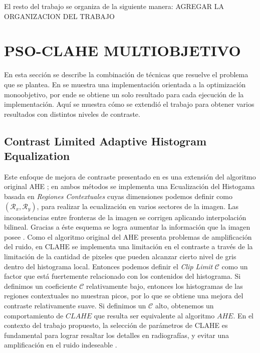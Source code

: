 \documentclass[spanish,twocolumn]{article}
\begin{document}
El resto del trabajo se organiza de la siguiente manera: {\color{red} AGREGAR LA ORGANIZACION DEL TRABAJO}




\section{PSO-CLAHE MULTIOBJETIVO}
\label{sec:psoclahe}

En esta sección se describe la combinación de técnicas que resuelve el problema que se plantea. En \cite{morebrizuela2014} se muestra una implementación orientada a la optimización monoobjetivo, por ende se obtiene un solo resultado para cada ejecución de la implementación. Aquí se muestra cómo se extendió el trabajo para obtener varios resultados con distintos niveles de contraste.

\subsection{Contrast Limited Adaptive Histogram Equalization}

Este enfoque de mejora de contraste presentado en \cite{Zuiderveld:1994:CLA:180895.180940} es una extensión del algoritmo original AHE \cite{pizer1987adaptive}; en ambos métodos se implementa una Ecualización del Histogama basada en {\it Regiones Contextuales} cuyas dimensiones podemos definir como  $(\mathcal{R}_x, \mathcal{R}_y)$, para realizar la ecualización en varios sectores de la imagen. Las inconsistencias entre fronteras de la imagen se corrigen aplicando interpolación bilineal. Gracias a éste esquema se logra aumentar la información que la imagen posee \cite{zimmerman1988evaluation}. Como el algoritmo original del AHE presenta problemas de amplificación del ruido, en CLAHE se implementa una limitación en el contraste a través de la limitación de la cantidad de pixeles que pueden alcanzar cierto nivel de gris dentro del histograma local. Entonces podemos definir el {\it Clip Limit} $\mathcal{C}$ como un factor que está fuertemente relacionado con los contenidos del histograma. Si definimos un coeficiente $\mathcal{C}$ relativamente bajo, entonces los histogramas de las regiones contextuales no muestran picos, por lo que se obtiene una mejora del contraste relativamente suave. Si definimos un $\mathcal{C}$ alto, obtenemos un comportamiento de $CLAHE$ que resulta ser equivalente al algoritmo $AHE$. En el contexto del trabajo propuesto, la selección de parámetros de CLAHE es fundamental para lograr resaltar los detalles en radiografías, y evitar una amplificación en el ruido indeseable \cite{pisano1998}.
\end{document}
